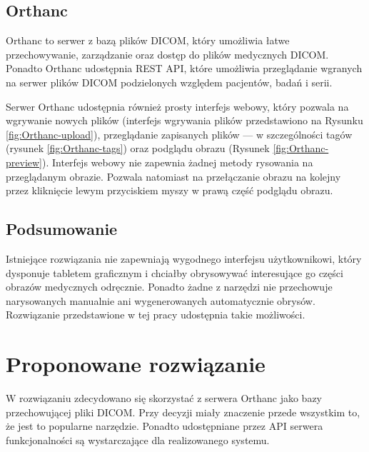\documentclass[a4paper,11pt,twoside,openright]{report}
\theoremstyle{definition}
\begin{document}
\subsection {Orthanc}

Orthanc to serwer z bazą plików DICOM, który umożliwia łatwe przechowywanie, zarządzanie oraz dostęp do plików medycznych DICOM. Ponadto Orthanc udostępnia REST API, które umożliwia przeglądanie wgranych na serwer plików DICOM podzielonych względem pacjentów, badań i serii.

Serwer Orthanc udostępnia również prosty interfejs webowy, który pozwala na wgrywanie nowych plików (interfejs wgrywania plików przedstawiono na Rysunku \ref{fig:Orthanc-upload}), przeglądanie zapisanych plików --- w szczególności tagów (rysunek \ref{fig:Orthanc-tags}) oraz podglądu obrazu (Rysunek \ref{fig:Orthanc-preview}). Interfejs webowy nie zapewnia żadnej metody rysowania na przeglądanym obrazie. Pozwala natomiast na przełączanie obrazu na kolejny przez kliknięcie lewym przyciskiem myszy w prawą część podglądu obrazu.

\subsection {Podsumowanie}

Istniejące rozwiązania nie zapewniają wygodnego interfejsu użytkownikowi, który dysponuje tabletem graficznym i chciałby obrysowywać interesujące go części obrazów medycznych odręcznie. Ponadto żadne z narzędzi nie przechowuje narysowanych manualnie ani wygenerowanych automatycznie obrysów.  Rozwiązanie przedstawione w tej pracy udostępnia takie możliwości.


\section {Proponowane rozwiązanie}

W rozwiązaniu zdecydowano się skorzystać z serwera Orthanc jako bazy przechowującej pliki DICOM. Przy decyzji miały znaczenie przede wszystkim to, że jest to popularne narzędzie. Ponadto udostępniane przez API serwera funkcjonalności są wystarczające dla realizowanego systemu.
\end{document}
